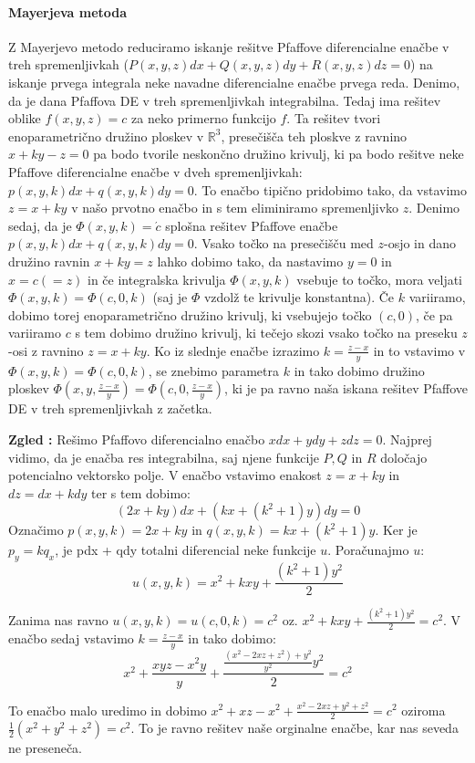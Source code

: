 \documentclass[a4paper, 10pt]{article}
\newcounter{zgledcount}
\newenvironment{zgled}{\begin{flushleft}\refstepcounter{zgledcount}\textbf{Zgled \arabic{zgledcount}:}}{\hfill\end{flushleft}}
\newcommand{\mth}[1]{\ensuremath{\mathbb{#1}}}
\newcommand{\R}{\mth{R}}
\begin{document}
					\paragraph{Mayerjeva metoda}
						Z Mayerjevo metodo reduciramo iskanje rešitve Pfaffove diferencialne enačbe v treh spremenljivkah ($P(x, y, z)dx + Q(x, y, z)dy + R(x, y, z)dz = 0$) na iskanje prvega integrala neke navadne diferencialne enačbe prvega reda. Denimo, da je dana Pfaffova DE v treh spremenljivkah integrabilna. Tedaj ima rešitev oblike $f(x, y, z) = c$ za neko primerno funkcijo $f$. Ta rešitev tvori enoparametrično družino ploskev v $\R^3$, presečišča teh ploskve z ravnino $x + ky - z = 0$ pa bodo tvorile neskončno družino krivulj, ki pa bodo rešitve neke Pfaffove diferencialne enačbe v dveh spremenljivkah: $p(x, y, k)dx + q(x, y, k)dy = 0$. To enačbo tipično pridobimo tako, da vstavimo $z = x + ky$ v našo prvotno enačbo in s tem eliminiramo spremenljivko $z$. Denimo sedaj, da je $\Phi(x, y, k) = \acute{c}$ splošna rešitev Pfaffove enačbe $p(x, y, k)dx + q(x, y, k)dy = 0$. Vsako točko na presečišču med $z$-osjo in dano družino ravnin $x + ky = z$ lahko dobimo tako, da nastavimo $y = 0$ in $x = c (=z)$ in če integralska krivulja $\Phi(x, y, k)$ vsebuje to točko, mora veljati $\Phi(x, y, k) = \Phi(c, 0, k)$ (saj je $\Phi$ vzdolž te krivulje konstantna). Če $k$ variiramo, dobimo torej enoparametrično družino krivulj, ki vsebujejo točko $(c, 0)$, če pa variiramo $c$ s tem dobimo družino krivulj, ki tečejo skozi vsako točko na preseku $z$-osi z ravnino $z = x + ky$. Ko iz slednje enačbe izrazimo $k = \frac{z - x}{y}$ in to vstavimo v $\Phi(x, y, k) = \Phi(c, 0, k)$, se znebimo parametra $k$ in tako dobimo družino ploskev $\Phi(x, y, \frac{z - x}{y}) = \Phi(c, 0, \frac{z - x}{y})$, ki je pa ravno naša iskana rešitev Pfaffove DE v treh spremenljivkah z začetka.
						
						\begin{zgled}
							Rešimo Pfaffovo diferencialno enačbo $xdx + ydy + zdz = 0$. Najprej vidimo, da je enačba res integrabilna, saj njene funkcije $P, Q$ in $R$ določajo potencialno vektorsko polje. V enačbo vstavimo enakost $z = x + ky$ in $dz = dx + kdy$ ter s tem dobimo: $$(2x+ky)dx + (kx+(k^2+1)y)dy = 0$$ Označimo $p(x, y, k) = 2x+ky$ in $q(x, y, k)=kx + (k^2+1)y$. Ker je $p_y = k q_x$, je pdx + qdy totalni diferencial neke funkcije $u$. Poračunajmo $u$: $$u(x, y, k)= x^2 + kxy + \frac{(k^2+1)y^2}{2} $$
							
							Zanima nas ravno $u(x, y, k) = u(c, 0, k) = c^2$ oz. $x^2 + kxy + \frac{(k^2+1)y^2}{2} = c^2$. V enačbo sedaj vstavimo $k = \frac{z - x}{y}$ in tako dobimo: $$ x^2 + \frac{xyz - x^2y}{y} + \frac{\frac{(x^2 - 2xz + z^2) + y^2}{y^2}y^2}{2} = c^2$$
							
							To enačbo malo uredimo in dobimo $x^2 + xz - x^2 + \frac{x^2 - 2xz + y^2 + z^2}{2} = c^2$ oziroma $\frac{1}{2}(x^2 + y^2 + z^2) = c^2$. To je ravno rešitev naše orginalne enačbe, kar nas seveda ne preseneča.
								
						\end{zgled}
						
\end{document}
